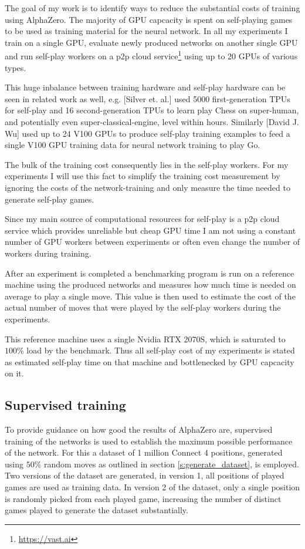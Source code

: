 \documentclass[12pt,onecolumn,oneside,titlepage]{article}
\begin{document}
The goal of my work is to identify ways to reduce the substantial costs of training using AlphaZero. The majority of GPU capcacity is spent on self-playing games to be used as training material for the neural network.
In all my experiments I train on a single GPU, evaluate newly produced networks on another single GPU and run self-play workers on a p2p cloud service\footnote{\url{https://vast.ai}} using up to 20 GPUs of various types.

This huge inbalance between training hardware and self-play hardware can be seen in related work as well, e.g. \cite{AlphaZero}[Silver et. al.] used 5000 first-generation TPUs for self-play and 16 second-generation TPUs 
to learn play Chess on super-human, and potentially even super-classical-engine, level within hours. Similarly \cite{wu2019accelerating}[David J. Wu] used up to 24 V100 GPUs to produce self-play training examples to feed a single V100 GPU training data for neural network training to play Go.

The bulk of the training cost consequently lies in the self-play workers. For my experiments I will use this fact to simplify the training cost measurement by ignoring the costs of the network-training and only measure the time needed to generate self-play games.

Since my main source of computational resources for self-play is a p2p cloud service which provides unreliable but cheap GPU time I am not using a constant number of GPU workers between experiments or often even change the number of workers during training.

After an experiment is completed a benchmarking program is run on a reference machine using the produced networks and measures how much time is needed on average 
to play a single move. This value is then used to estimate the cost of the actual number of moves that were played by the self-play workers during the experiments.

This reference machine uses a single Nvidia RTX 2070S, which is saturated to $100\%$ load by the benchmark. Thus all self-play cost of my experiments is stated as estimated self-play time on that machine and bottlenecked by GPU capcacity on it.

\subsection{Supervised training}\label{sec:supervised}

To provide guidance on how good the results of AlphaZero are, supervised training of the networks is used to establish the maximum possible performance of the network.
For this a dataset of 1 million Connect 4 positions, generated using $50\%$ random moves as outlined in section \ref{s:generate_dataset}, is employed. Two versions of the dataset are generated, in version 1, all positions of played games are used as training data.
In version 2 of the dataset, only a single position is randomly picked from each played game, increasing the number of distinct games played to generate the dataset substantially.
\end{document}
